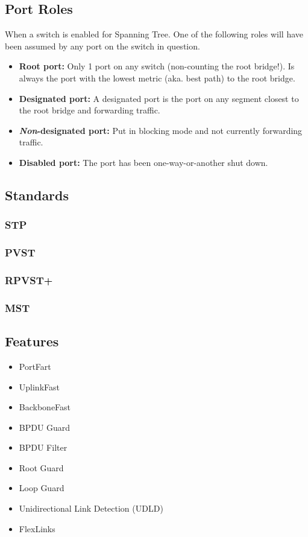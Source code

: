 \documentclass[a4paper,12pt,twoside,twocolumn]{book}
\begin{document}
\subsection{Port Roles}

When a switch is enabled for Spanning Tree. One of the following roles will have been assumed by any port on the switch in question.

\begin{itemize}
	\item \textbf{Root port:} Only 1 port on any switch (non-counting the root bridge!). Is always the port with the lowest metric (aka. best path) to the root bridge.
	\item \textbf{Designated port:} A designated port is the port on any segment closest to the root bridge and forwarding traffic.
	\item \textbf{\textit{Non}-designated port:} Put in blocking mode and not currently forwarding traffic.
	\item \textbf{Disabled port:} The port has been one-way-or-another shut down.
\end{itemize}

\subsection{Standards}

\subsubsection{STP}

\subsubsection{PVST}

\subsubsection{RPVST+}

\subsubsection{MST}

\subsection{Features}

\begin{itemize}
	\item PortFart
	\item UplinkFast
	\item BackboneFast
	\item BPDU Guard
	\item BPDU Filter
	\item Root Guard
	\item Loop Guard
	\item Unidirectional Link Detection (UDLD)
	\item FlexLinks
\end{itemize}
\end{document}

